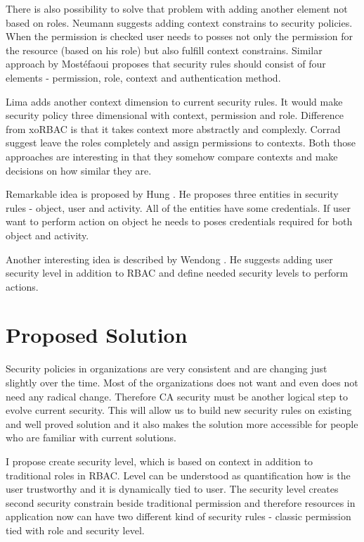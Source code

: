 \documentclass{poster15}
\begin{document}
There is also possibility to solve that problem with adding another element not based on roles. Neumann \cite{xorbac} suggests adding context constrains to security policies. When the permission is checked user needs to posses not only the permission for the resource (based on his role) but also fulfill context constrains. Similar approach by Most\'efaoui \cite{genericcontext} proposes that security rules should consist of four elements - permission, role, context and authentication method.

Lima \cite{contextlayer} adds another context dimension to current security rules. It would make security policy three dimensional with context, permission and role. Difference from xoRBAC \cite{xorbac} is that it takes context more abstractly and complexly. Corrad \cite{ubiscom} suggest leave the roles completely and assign permissions to contexts. Both those approaches are interesting in that they somehow compare contexts and make decisions on how similar they are.

Remarkable idea is proposed by Hung \cite{hung}. He proposes three entities in security rules - object, user and activity. All of the entities have some credentials. If user want to perform action on object he needs to poses credentials required for both object and activity.

Another interesting idea is described by Wendong \cite{wendong}. He suggests adding user security level in addition to RBAC and define needed security levels to perform actions.

\section{Proposed Solution}

Security policies in organizations are very consistent and are changing just slightly over the time. Most of the organizations does not want and even does not need any radical change. Therefore CA security must be another logical step to evolve current security. This will allow us to build new security rules on existing and well proved solution and it also makes the solution more accessible for people who are familiar with current solutions.

I propose create security level, which is based on context in addition to traditional roles in RBAC. Level can be understood as quantification how is the user trustworthy and it is dynamically tied to user. The security level creates second security constrain beside traditional permission and therefore resources in application now can have two different kind of security rules - classic permission tied with role and security level.
\end{document}
